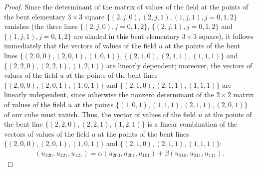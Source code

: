 \documentclass[pdftex]{sigma}
\begin{document}
\begin{proof}
Since the determinant of the matrix of values of the f\/ield at the
points of the bent elementary $3 \times 3$ square $\{(2, j, 0), (2,
j, 1), (1, j, 1), j = 0, 1, 2\}$ vanishes (the three lines $\{(2, j,
0), j = 0, 1, 2\}$, $\{(2, j, 1), j = 0, 1, 2\}$ and $\{(1, j, 1), j
= 0, 1, 2\}$ are shaded in this bent elementary $3 \times 3$
square), it follows immediately that the vectors of values of the
f\/ield $u$ at the points of the bent lines $\{(2, 0, 0), (2, 0, 1),
(1, 0, 1)\}$, $\{(2, 1, 0), (2, 1, 1), (1, 1, 1)\}$ and $\{(2, 2,
0), (2, 2, 1), (1, 2, 1)\}$ are linearly dependent; moreover, the
vectors of values of the f\/ield $u$ at the points of the bent lines
$\{(2, 0, 0), (2, 0, 1), (1, 0, 1)\}$ and $\{(2, 1, 0), (2, 1, 1),
(1, 1, 1)\}$ are linearly independent, since otherwise the nonzero
determinant of the $2 \times 2$ matrix of values of the f\/ield $u$ at
the points $\{(1, 0, 1), (1, 1, 1), (2, 1, 1), (2, 0, 1)\}$ of our
cube must vanish. Thus, the vector of values of the f\/ield $u$ at the
points of the bent line $\{(2, 2, 0), (2, 2, 1), (1, 2, 1)\}$ is a
linear combination of the vectors of values of the f\/ield $u$ at the
points of the bent lines $\{(2, 0, 0), (2, 0, 1), (1, 0, 1)\}$ and
$\{(2, 1, 0), (2, 1, 1), (1, 1, 1)\}$: \begin{gather} (u_{2 2 0}, u_{2 2 1},
u_{1 2 1}) = \alpha (u_{2 0 0}, u_{2 0 1}, u_{1 0 1}) + \beta (u_{2
1 0}, u_{2 1 1}, u_{1 1 1}). \label{7xxyb2} \end{gather}



\end{proof}
\end{document}
